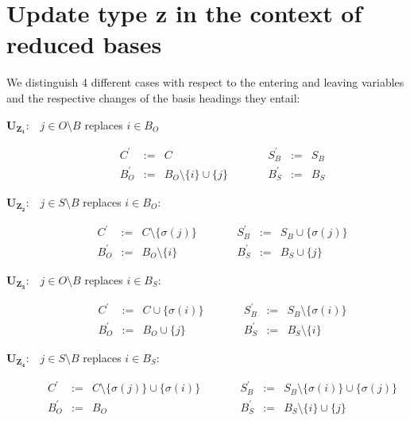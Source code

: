\documentclass[a4paper]{article}
\begin{document}
\section{Update type z in the context of reduced bases}
We distinguish 4 different cases with respect to the entering and leaving
variables and the respective changes of the basis headings they entail:
\begin{description}

\item [$\mathbf{U_{Z_{1}}}$:$\quad j \in O \setminus B$ replaces $i \in B_{O}$]
\begin{equation}
\label{update:o_rep_o}
\begin{array}{ccccccc}
C^{\prime}      &:=&  C     &\quad\quad&
S_{B}^{\prime}  &:=&  S_{B}  \\
B_{O}^{\prime}  &:=&  B_{O} \setminus \{i\} \cup \{j\}  &\quad\quad&
B_{S}^{\prime}  &:=&  B_{S}
\end{array}
\end{equation}

\item [$\mathbf{U_{Z_{2}}}$:$\quad j \in S \setminus B$ replaces $i \in B_{O}$:]
\begin{equation}
\label{update:s_rep_o}
\begin{array}{ccccccc}
C^{\prime}      &:=& C \setminus \{\sigma(j)\}   &\quad\quad&
S_{B}^{\prime}  &:=& S_{B} \cup  \{\sigma(j)\}   \\
B_{O}^{\prime}  &:=& B_{O} \setminus \{i\} &\quad\quad&
B_{S}^{\prime}  &:=&B_{S} \cup \{j\}  
\end{array}
\end{equation}

\item [$\mathbf{U_{Z_{3}}}$:$\quad j \in O \setminus B$ replaces $i \in B_{S}$:]
\begin{equation}
\label{update:o_rep_s}
\begin{array}{ccccccc}
C^{\prime}      &:=& C \cup \{\sigma(i)\}   &\quad\quad&
S_{B}^{\prime}  &:=& S_{B} \setminus  \{\sigma(i)\}   \\
B_{O}^{\prime}  &:=& B_{O} \cup \{j\} &\quad\quad&
B_{S}^{\prime}  &:=&B_{S} \setminus \{i\}  
\end{array}
\end{equation}

\item [$\mathbf{U_{Z_{4}}}$:$\quad j \in S \setminus B$ replaces $i \in B_{S}$:]
\begin{equation}
\label{update:s_rep_s}
\begin{array}{ccccccc}
C^{\prime}      &:=& C \setminus \{\sigma(j)\} \cup \{\sigma(i)\}  &\quad\quad&
S_{B}^{\prime}  &:=& S_{B} \setminus  \{\sigma(i)\} \cup \{\sigma(j)\}   \\
B_{O}^{\prime}  &:=& B_{O}                                         &\quad\quad&
B_{S}^{\prime}  &:=&B_{S} \setminus \{i\} \cup \{j\} 
\end{array}
\end{equation}
\end{description} 
\end{document}
